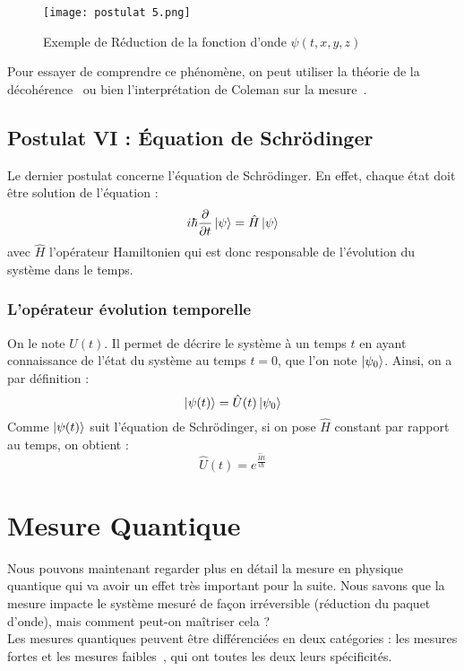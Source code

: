 \documentclass[11pt]{article}
\begin{document}
\begin{figure}[h]
 \caption{Exemple de Réduction de la fonction d'onde \( \psi(t,x,y,z) \)~\cite{figure}}
 \texttt{[image: postulat 5.png]}
 \centering
 \label{fig:reduction}
\end{figure}

Pour essayer de comprendre ce phénomène, on peut utiliser la théorie de la décohérence~\cite{wikDQ} ou bien l'interprétation de Coleman sur la mesure~\cite{ColemanInt}.

\subsection{Postulat VI : Équation de Schrödinger}

Le dernier postulat concerne l'équation de Schrödinger. En effet, chaque état doit être solution de l'équation :
\[
i\hbar \frac{\partial}{\partial t} \ket{\psi} = \hat{H} \ket{\psi}
\]
avec \( \hat{H} \) l'opérateur Hamiltonien qui est donc responsable de l'évolution du système dans le temps.

\subsubsection{L'opérateur évolution temporelle}

On le note \( \hat{U}(t) \). Il permet de décrire le système à un temps \( t \) en ayant connaissance de l'état du système au temps \( t=0 \), que l'on note \( \ket{\psi_0} \).
Ainsi, on a par définition :
\[
\ket{\psi(t)} = \hat{U}(t) \ket{\psi_0}
\]
Comme \( \ket{\psi(t)} \) suit l'équation de Schrödinger, si on pose \( \hat{H} \) constant par rapport au temps, on obtient :
\[
\hat{U}(t) = e^{\frac{\hat{H} t}{i\hbar}}
\]


\newpage

\section{Mesure Quantique}
\qquad Nous pouvons maintenant regarder plus en détail la mesure en physique quantique qui va avoir un effet très important pour la suite.
Nous savons que la mesure impacte le système mesuré de façon irréversible (réduction du paquet d'onde), mais comment peut-on maîtriser cela ?\\
\qquad Les mesures quantiques peuvent être différenciées en deux catégories : les mesures fortes et les mesures faibles~\cite{wikF}, qui ont toutes les deux leurs spécificités. 
\end{document}
